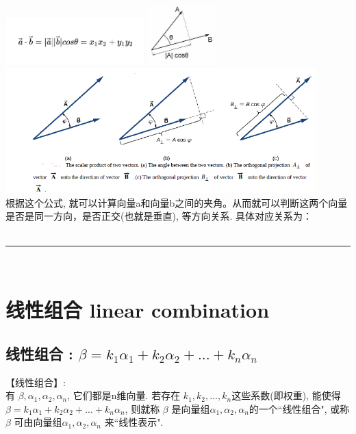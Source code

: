 \documentclass[UTF8]{ctexart}
\begin{document}
\includegraphics[width=0.4\textwidth]{img/0097.png}
\includegraphics[width=0.2\textwidth]{img/0098.png} \\
\includegraphics[width=0.9\textwidth]{img/0099.png} \\

根据这个公式, 就可以计算向量a和向量b之间的夹角。从而就可以判断这两个向量是否是同一方向，是否正交(也就是垂直), 等方向关系. 具体对应关系为：\\

~\\
\hrule
~\\





\section{线性组合 linear combination}

\subsection{线性组合 : $\beta =k_1\alpha _1+k_2\alpha _2+...+k_n\alpha _n$ }

【线性组合】: \\
有 $ \beta, \alpha_1, \alpha_2, \alpha_n$, 它们都是n维向量. 若存在 $k_1, k_2, ..., k_n$这些系数(即权重), 能使得 $\beta =k_1\alpha _1+k_2\alpha _2+...+k_n\alpha _n$, 则就称 $\beta$ 是向量组$\alpha_1, \alpha_2, \alpha_n$的一个``线性组合", 或称 $\beta$ 可由向量组$\alpha_1, \alpha_2, \alpha_n$ 来``线性表示". \\
\end{document}
